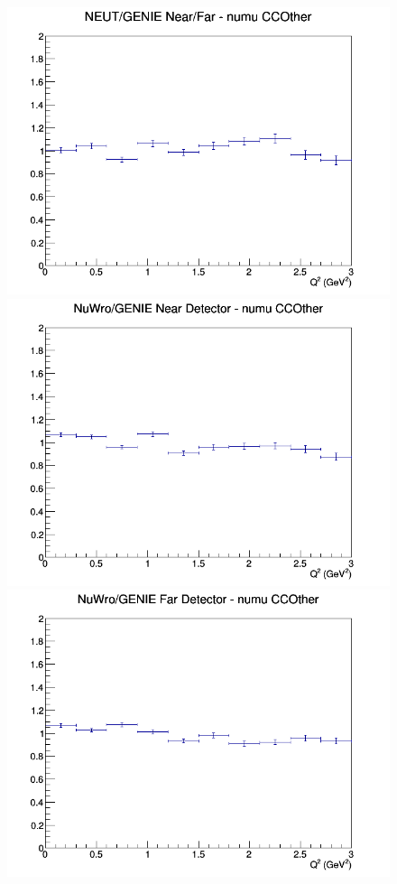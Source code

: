 \begin{figure}[h]
\endminipage
{}
\includegraphics[width=\linewidth]{eff_Q2/LAr/ratios/CCOther_NEUT_GENIE_numu_NF_Q2.png}
\endminipage
\newline
{}
\includegraphics[width=\linewidth]{eff_Q2/LAr/ratios/CCOther_NuWro_GENIE_numu_near_Q2.png}
\endminipage
{}
\includegraphics[width=\linewidth]{eff_Q2/LAr/ratios/CCOther_NuWro_GENIE_numu_far_Q2.png}

\end{figure}

